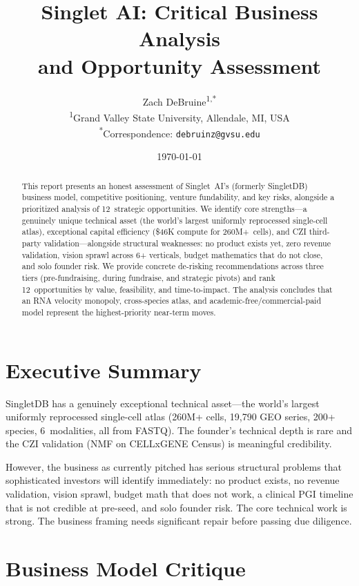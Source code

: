 \documentclass[10pt,twocolumn,letterpaper]{article}
\title{Singlet AI: Critical Business Analysis\\
  and Opportunity Assessment}
\author{%
  Zach DeBruine\textsuperscript{1,*}\\[4pt]
  \textsuperscript{1}Grand Valley State University, Allendale, MI, USA\\
  \textsuperscript{*}Correspondence: \texttt{debruinz@gvsu.edu}
}
\date{\today}
\begin{document}
\maketitle

\begin{abstract}
This report presents an honest assessment of Singlet~AI's (formerly SingletDB)
business model, competitive positioning, venture fundability, and key risks,
alongside a prioritized analysis of 12~strategic opportunities. We identify core
strengths---a genuinely unique technical asset (the world's largest uniformly
reprocessed single-cell atlas), exceptional capital efficiency (\$46K compute for
260M+~cells), and CZI third-party validation---alongside structural weaknesses:
no product exists yet, zero revenue validation, vision sprawl across 6+ verticals,
budget mathematics that do not close, and solo founder risk. We provide concrete
de-risking recommendations across three tiers (pre-fundraising, during fundraise,
and strategic pivots) and rank 12~opportunities by value, feasibility, and
time-to-impact. The analysis concludes that an RNA velocity monopoly, cross-species
atlas, and academic-free/commercial-paid model represent the highest-priority
near-term moves.
\end{abstract}

\section{Executive Summary}
\label{sec:summary}

SingletDB has a genuinely exceptional technical asset---the world's largest
uniformly reprocessed single-cell atlas (260M+ cells, 19,790 GEO series, 200+
species, 6~modalities, all from FASTQ). The founder's technical depth is rare
and the CZI validation (NMF on CELLxGENE Census) is meaningful credibility.

However, the business as currently pitched has serious structural problems that
sophisticated investors will identify immediately: no product exists, no revenue
validation, vision sprawl, budget math that does not work, a clinical PGI
timeline that is not credible at pre-seed, and solo founder risk. The core
technical work is strong. The business framing needs significant repair before
passing due diligence.

\section{Business Model Critique}
\label{sec:critique}
\end{document}
